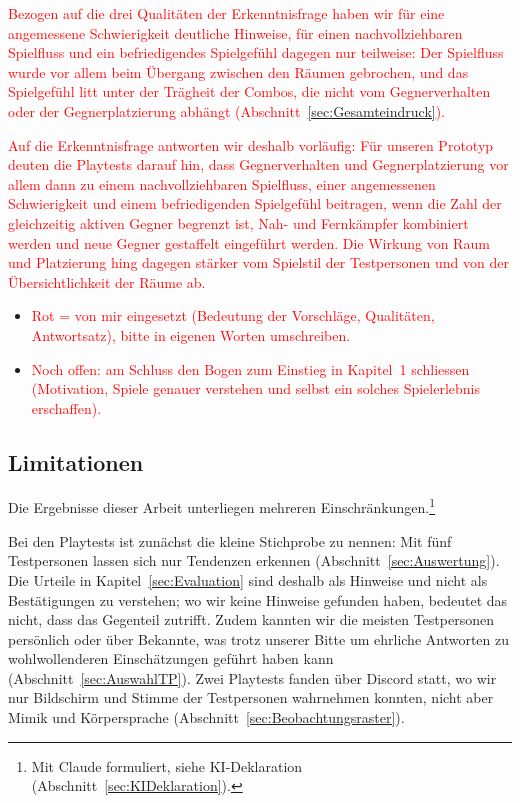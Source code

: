 \documentclass[../Main.tex]{subfiles}
\begin{document}
\textcolor{red}{Bezogen auf die drei Qualitäten der Erkenntnisfrage haben wir für eine angemessene Schwierigkeit deutliche Hinweise, für einen nachvollziehbaren Spielfluss und ein befriedigendes Spielgefühl dagegen nur teilweise: Der Spielfluss wurde vor allem beim Übergang zwischen den Räumen gebrochen, und das Spielgefühl litt unter der Trägheit der Combos, die nicht vom Gegnerverhalten oder der Gegnerplatzierung abhängt (Abschnitt~\ref{sec:Gesamteindruck}).}

\textcolor{red}{Auf die Erkenntnisfrage antworten wir deshalb vorläufig: Für unseren Prototyp deuten die Playtests darauf hin, dass Gegnerverhalten und Gegnerplatzierung vor allem dann zu einem nachvollziehbaren Spielfluss, einer angemessenen Schwierigkeit und einem befriedigenden Spielgefühl beitragen, wenn die Zahl der gleichzeitig aktiven Gegner begrenzt ist, Nah- und Fernkämpfer kombiniert werden und neue Gegner gestaffelt eingeführt werden. Die Wirkung von Raum und Platzierung hing dagegen stärker vom Spielstil der Testpersonen und von der Übersichtlichkeit der Räume ab.}

\begin{itemize}[leftmargin=1.5cm]
    \item \textcolor{red}{Rot = von mir eingesetzt (Bedeutung der Vorschläge, Qualitäten, Antwortsatz), bitte in eigenen Worten umschreiben.}
    \item \textcolor{red}{Noch offen: am Schluss den Bogen zum Einstieg in Kapitel~1 schliessen (Motivation, Spiele genauer verstehen und selbst ein solches Spielerlebnis erschaffen).}
\end{itemize}

\subsection{Limitationen} \label{sec:Limitationen}

Die Ergebnisse dieser Arbeit unterliegen mehreren Einschränkungen.\footnote{Mit Claude formuliert, siehe KI-Deklaration (Abschnitt~\ref{sec:KIDeklaration}).}

Bei den Playtests ist zunächst die kleine Stichprobe zu nennen: Mit fünf Testpersonen lassen sich nur Tendenzen erkennen (Abschnitt~\ref{sec:Auswertung}). Die Urteile in Kapitel~\ref{sec:Evaluation} sind deshalb als Hinweise und nicht als Bestätigungen zu verstehen; wo wir keine Hinweise gefunden haben, bedeutet das nicht, dass das Gegenteil zutrifft. Zudem kannten wir die meisten Testpersonen persönlich oder über Bekannte, was trotz unserer Bitte um ehrliche Antworten zu wohlwollenderen Einschätzungen geführt haben kann (Abschnitt~\ref{sec:AuswahlTP}). Zwei Playtests fanden über Discord statt, wo wir nur Bildschirm und Stimme der Testpersonen wahrnehmen konnten, nicht aber Mimik und Körpersprache (Abschnitt~\ref{sec:Beobachtungsraster}).
\end{document}
